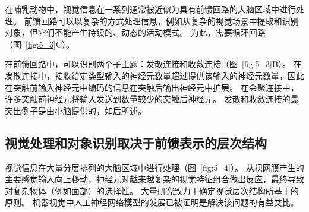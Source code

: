 在哺乳动物中，视觉信息在一系列通常被近似为具有前馈回路的大脑区域中进行处理。
前馈回路可以以复杂的方式处理信息，例如从复杂的视觉场景中提取和识别对象，但它们不能产生持续的、动态的活动模式。 
为此，需要循环回路（图~\ref{fig:5_3}C）。


在前馈回路中，可以识别两个子主题：发散连接和收敛连接（图~\ref{fig:5_3}B）。 
在发散连接中，接收给定类型输入的神经元数量超过提供该输入的神经元数量，因此在突触前输入神经元中编码的信息在突触后输出神经元中扩展。
在会聚连接中，许多突触前神经元将输入发送到数量较少的突触后神经元。
发散和收敛连接的最突出例子是由小脑提供的，如后所述。



\subsection{视觉处理和对象识别取决于前馈表示的层次结构}

视觉信息在大量分层排列的大脑区域中进行处理（图~\ref{fig:5_4}）。
从视网膜产生的主要感觉输入向上移动，神经元对越来越复杂的视觉特征组合做出反应，最终导致对复杂物体（例如面部）的选择性。
大量研究致力于确定视觉层次结构所基于的原则。
机器视觉中人工神经网络模型的发展已被证明是解决该问题的有益类比。


